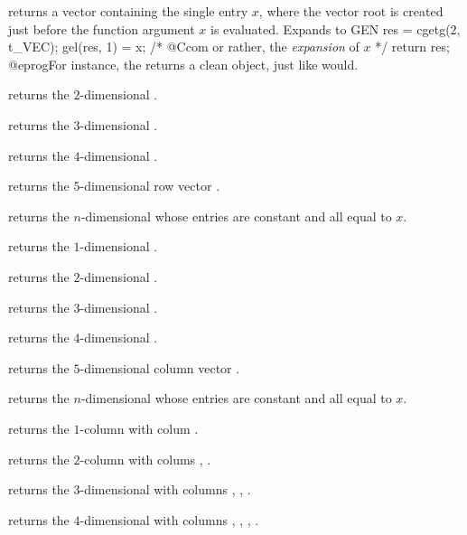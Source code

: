  returns a vector containing the single entry $x$,
where the vector root is created just before the function argument $x$ is
evaluated. Expands to
\bprog
  {
    GEN res = cgetg(2, t_VEC);
    gel(res, 1) = x; /* @Ccom or rather, the \emph{expansion} of $x$ */
    return res;
  }
@eprog\noindent For instance, the  returns a clean
object, just like  would.

returns the $2$-dimensional  \kbd{[x,y]}.

returns the $3$-dimensional  \kbd{[x,y,z]}.

returns the $4$-dimensional  \kbd{[x,y,z,t]}.

returns the $5$-dimensional row vector \kbd{[x,y,z,t,u]}.

returns the $n$-dimensional  whose entries are constant and all
equal to $x$.

returns the $1$-dimensional  \kbd{[x]~}.

returns the $2$-dimensional  \kbd{[x,y]~}.

returns the $3$-dimensional  \kbd{[x,y,z]~}.

returns the $4$-dimensional  \kbd{[x,y,z,t]~}.

returns the $5$-dimensional column vector \kbd{[x,y,z,t,u]~}.

returns the $n$-dimensional  whose entries are constant and all
equal to $x$.

returns the $1$-column  with colum .

returns the $2$-column  with colums , .

returns the $3$-dimensional  with columns
, , .

returns the $4$-dimensional  with columns
, , , .

